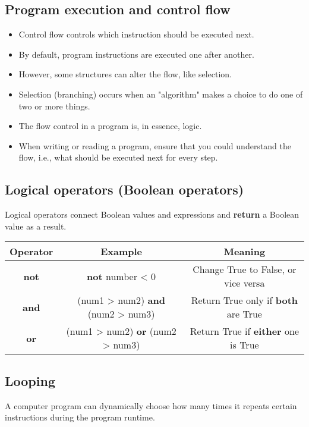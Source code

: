 \documentclass[11pt]{article}
\begin{document}
\subsection{Program execution and control flow}
\label{sec:org57ca973}
\begin{itemize}
\item Control flow controls which instruction should be executed next.
\item By default, program instructions are executed one after another.
\item However, some structures can alter the flow, like selection.
\item Selection (branching) occurs when an "algorithm" makes a choice to do one of two or more things.
\item The flow control in a program is, in essence, logic.
\item When writing or reading a program, ensure that you could understand the flow, i.e., what should be executed next for every step.
\end{itemize}

\subsection{Logical operators (Boolean operators)}
\label{sec:orgfa45b64}
Logical operators connect Boolean values and expressions and \textbf{return} a Boolean value as a result.

\begin{center}
\begin{tabular}{c|c|c}
Operator & Example & Meaning\\[0pt]
\hline
\textbf{not} & \textbf{not} number < 0 & Change True to False, or vice versa\\[0pt]
\textbf{and} & (num1 > num2) \textbf{and} (num2 > num3) & Return True only if \textbf{both} are True\\[0pt]
\textbf{or} & (num1 > num2) \textbf{or} (num2 > num3) & Return True if \textbf{either} one is True\\[0pt]
\end{tabular}
\end{center}

 \newpage

\subsection{Looping}
\label{sec:org5c55f43}
A computer program can dynamically choose how many times it repeats certain instructions during the program runtime.
\end{document}
